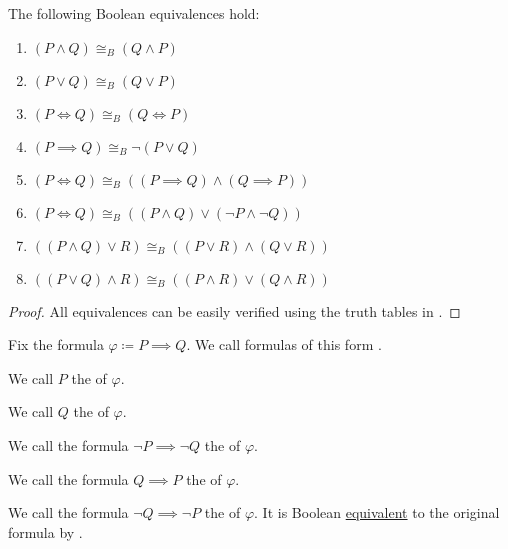 \begin{proposition}\label{thm:boolean_equivalences}
  The following Boolean equivalences hold:
  \begin{enumerate}
    \item \( (P \land Q) \cong_B (Q \land P) \)
    \item \( (P \lor Q) \cong_B (Q \lor P) \)
    \item \( (P \iff Q) \cong_B (Q \iff P) \)
    \item \( (P \implies Q) \cong_B \neg (P \lor Q) \)
    \item \( (P \iff Q) \cong_B ((P \implies Q) \land (Q \implies P)) \)
    \item \( (P \iff Q) \cong_B ((P \land Q) \lor (\neg P \land \neg Q)) \)
    \item \( ((P \land Q) \lor R) \cong_B ((P \lor R) \land (Q \lor R)) \)
    \item \( ((P \lor Q) \land R) \cong_B ((P \land R) \lor (Q \land R)) \)
  \end{enumerate}
\end{proposition}
\begin{proof}
  All equivalences can be easily verified using the truth tables in .
\end{proof}

\begin{definition}\label{def:material_implication}
  Fix the formula \( \varphi \coloneqq P \implies Q \). We call formulas of this form .

  \begin{defenum}
     We call \( P \) the  of \( \varphi \).

     We call \( Q \) the  of \( \varphi \).

     We call the formula \( \neg P \implies \neg Q \) the  of \( \varphi \).

     We call the formula \( Q \implies P \) the  of \( \varphi \).

     We call the formula \( \neg Q \implies \neg P \) the  of \( \varphi \). It is Boolean \hyperref[def:propositional_interpretation]{equivalent} to the original formula by .
  \end{defenum}
\end{definition}

